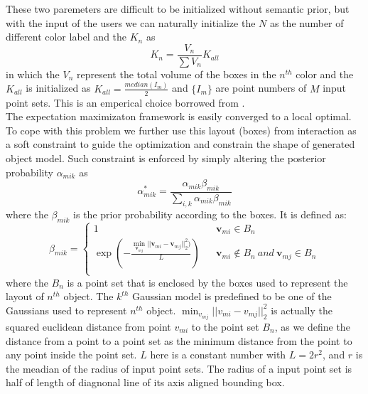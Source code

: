 These two paremeters are difficult to be initialized without semantic prior, but with the input of the users we can naturally initialize the $N$ as the number of different color label and the ${K_n}$ as 
\begin{equation}
\label{equ:K_n}
K_n=\frac{V_n}{\sum V_n}K_{all}
\end{equation}
in which the $V_n$ represent the total volume of the boxes in the $n^{th}$ color and the $K_{all}$ is initialized as $K_{all}=\frac{median(I_m)}{2}$ and $\{I_m\}$ are point numbers of $M$ input point sets. This is an emperical choice borrowed from \cite{Evangelidis2014}.\\
The expectation maximizaton framework is easily converged to a local optimal. To cope with this problem we further use this layout (boxes) from interaction as a soft constraint to guide the optimization and constrain the shape of generated object model. Such constraint is enforced by simply altering the posterior probability $\alpha_{mik}$ as\\
\begin{equation}
\label{equ:alteralpha}
\alpha_{mik}^*=\frac{\alpha_{mik}\beta_{mik}}{\sum_{i,k}\alpha_{mik}\beta_{mik}}
\end{equation}
where the $\beta_{mik}$ is the prior probability according to the boxes. It is defined as:\\
\begin{equation}
\beta_{mik}=\left\{
\begin{array}{rcl}
1& &\pmb v_{mi} \in B_n\\
\exp(-\frac{\min_{\pmb v_{mj}}|| \pmb v_{mi} - \pmb v_{mj} ||_2^2  )}{L})& &\pmb v_{mi} \notin B_n~and~\pmb v_{mj} \in B_n\\
\end{array} \right.
\end{equation}
where the $B_n$ is a point set that is enclosed by the boxes used to represent the layout of $n^{th}$ object. The $k^{th}$ Gaussian model is predefined to be one of the Gaussians used to represent $n^{th}$ object. $\min_{v_{mj}}|| v_{mi} - v_{mj} ||_2^2$ is actually the squared euclidean distance from point $v_{mi}$ to the point set $B_n$, as we define the distance from a point to a point set as the minimum distance from the point to any point inside the point set. $L$ here is a constant number with $L=2r^2$, and $r$ is the meadian of the radius of input point sets. The radius of a input point set is half of length of diagnonal line of its axis aligned bounding box.   
